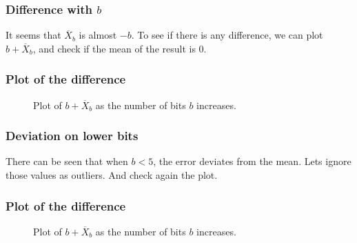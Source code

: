 \documentclass[serif, 12pt]{beamer}
\begin{document}
\begin{frame}

\frametitle{Difference with $b$}

It seems that $\overline X_b$ is almost $-b$. To see if there is any difference, 
we can plot $b + \overline X_b$, and check if the mean of the result is 0.

\end{frame}


\begin{frame}

\frametitle{Plot of the difference}

\begin{figure}[h]
	\caption{Plot of $b + \overline X_b$ as the number of bits $b$ increases.}
	\label{fig:errhh}
\end{figure}

\end{frame}


\begin{frame}

\frametitle{Deviation on lower bits}

There can be seen that when $b < 5$, the error deviates from the mean. Lets 
ignore those values as outliers. And check again the plot.

\end{frame}


\begin{frame}

\frametitle{Plot of the difference}

\begin{figure}[h]
	\caption{Plot of $b + \overline X_b$ as the number of bits $b$ increases.}
	\label{fig:errhh}
\end{figure}

\end{frame}
\end{document}
